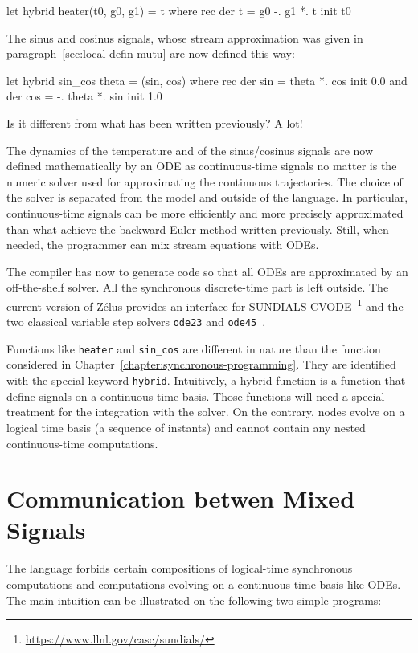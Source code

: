 \documentclass[11pt,titlepage,twoside]{report}
\newcommand{\zelus}{{\sf Z\'elus}}
\begin{document}
\begin{runverbatim}[withresult]
let hybrid heater(t0, g0, g1) = t where
  rec der t = g0 -. g1 *. t init t0
\end{runverbatim}

The sinus and cosinus signals, whose stream approximation was given in
paragraph~\ref{sec:local-defin-mutu} are now defined this way:
\begin{runverbatim}[withresult]
let hybrid sin_cos theta = (sin, cos) where
  rec der sin = theta *. cos init 0.0
  and der cos = -. theta *. sin init 1.0
\end{runverbatim}

Is it different from what has been written previously? A lot!

\medskip
The dynamics of the temperature and of the sinus/cosinus signals are
now defined mathematically by an \ac{ODE} as continuous-time signals no
matter is the numeric solver used for approximating the continuous
trajectories. The choice of the solver is separated from the model and
outside of the language. In particular, continuous-time signals can be
more efficiently and more precisely approximated than what achieve the
backward Euler method written previously. Still, when needed, the
programmer can mix stream equations with \acp{ODE}.


\medskip The compiler has now to generate code so that all \acp{ODE} are
approximated by an off-the-shelf solver. All the synchronous
discrete-time part is left outside. The current version of \zelus{}
provides an interface for SUNDIALS
CVODE~\cite{sundials:2005}\footnote{\url{https://www.llnl.gov/casc/sundials/}}
and the two classical variable step solvers \texttt{ode23} and
\texttt{ode45}~\cite{DahlquistBjo08}.

\medskip Functions like \verb+heater+ and \verb+sin_cos+ are different
in nature than the function considered in
Chapter~\ref{chapter:synchronous-programming}. They are identified
with the special keyword \texttt{hybrid}. Intuitively, a hybrid
function is a function that define signals on a continuous-time
basis. Those functions will need a special treatment for the
integration with the solver. On the contrary, nodes evolve on a
logical time basis (a sequence of instants) and cannot contain any nested
continuous-time computations.

\section{Communication betwen Mixed Signals}
The language forbids certain compositions of logical-time synchronous
computations and computations evolving on a continuous-time basis like
\acp{ODE}. The main intuition can be illustrated on the following two simple 
programs:
\end{document}
